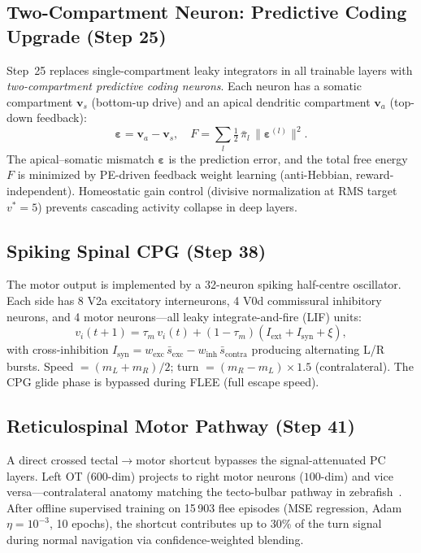 \documentclass[11pt,a4paper]{article}
\begin{document}
\subsection{Two-Compartment Neuron: Predictive Coding Upgrade (Step 25)}

Step~25 replaces single-compartment leaky integrators in all trainable
layers with \emph{two-compartment predictive coding neurons}.
Each neuron has a somatic compartment $\mathbf{v}_s$ (bottom-up drive)
and an apical dendritic compartment $\mathbf{v}_a$ (top-down feedback):
\begin{equation}
  \boldsymbol{\varepsilon} = \mathbf{v}_a - \mathbf{v}_s,
  \quad
  F = \sum_l \tfrac{1}{2}\,\bar{\pi}_l\,\|\boldsymbol{\varepsilon}^{(l)}\|^2.
\end{equation}
The apical--somatic mismatch $\boldsymbol{\varepsilon}$ is the prediction
error, and the total free energy $F$ is minimized by PE-driven feedback
weight learning (anti-Hebbian, reward-independent).
Homeostatic gain control (divisive normalization at RMS target $v^* = 5$)
prevents cascading activity collapse in deep layers.

\subsection{Spiking Spinal CPG (Step 38)}\label{sec:cpg_arch}

The motor output is implemented by a 32-neuron spiking half-centre oscillator.
Each side has 8 V2a excitatory interneurons, 4 V0d commissural inhibitory
neurons, and 4 motor neurons---all leaky integrate-and-fire (LIF) units:
\begin{equation}
  v_i(t{+}1) = \tau_m\,v_i(t) + (1{-}\tau_m)(I_\text{ext} + I_\text{syn} + \xi),
\end{equation}
with cross-inhibition $I_\text{syn} = w_\text{exc}\,\bar{s}_\text{exc}
- w_\text{inh}\,\bar{s}_\text{contra}$ producing alternating L/R bursts.
Speed $= (m_L + m_R)/2$; turn $= (m_R - m_L)\times 1.5$ (contralateral).
The CPG glide phase is bypassed during FLEE (full escape speed).

\subsection{Reticulospinal Motor Pathway (Step 41)}\label{sec:reticulo_arch}

A direct crossed tectal$\to$motor shortcut bypasses the signal-attenuated
PC layers.  Left OT ($600$-dim) projects to right motor neurons ($100$-dim)
and vice versa---contralateral anatomy matching the tecto-bulbar pathway
in zebrafish~\cite{orger2008}.  After offline supervised training on 15\,903
flee episodes (MSE regression, Adam $\eta = 10^{-3}$, 10 epochs),
the shortcut contributes up to 30\% of the turn signal during
normal navigation via confidence-weighted blending.
\end{document}

